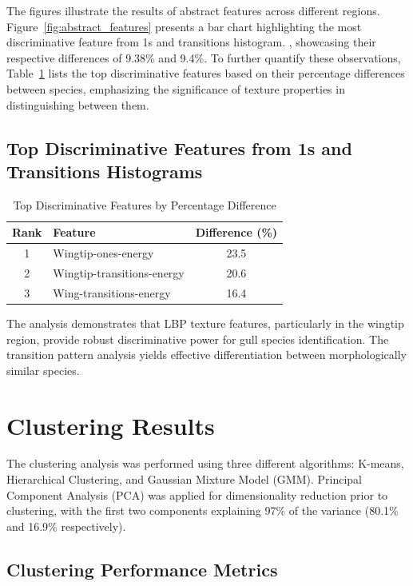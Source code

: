 \documentclass[a4paper,12pt]{report}
\begin{document}
The figures illustrate the results of abstract features across different regions. Figure~\ref{fig:abstract_features} presents a bar chart highlighting the most discriminative feature from 1s and transitions histogram. , showcasing their respective differences of 9.38\% and 9.4\%. To further quantify these observations, Table~\ref{tab:top_discriminative_features} lists the top discriminative features based on their percentage differences between species, emphasizing the significance of texture properties in distinguishing between them.

\subsection{Top Discriminative Features from 1s and Transitions Histograms}
\begin{table}[H]
    \centering
    \caption{Top Discriminative Features by Percentage Difference}
    \begin{tabular}{clc}
        \hline
        Rank & Feature & Difference (\%) \\
        \hline
        1 & Wingtip-ones-energy & 23.5 \\
        2 & Wingtip-transitions-energy & 20.6 \\
        3 & Wing-transitions-energy & 16.4 \\
        \hline
    \end{tabular}
    \label{tab:top_discriminative_features}
\end{table}

The analysis demonstrates that LBP texture features, particularly in the wingtip region, provide robust discriminative power for gull species identification. The transition pattern analysis yields effective differentiation between morphologically similar species.

\section{Clustering Results}

The clustering analysis was performed using three different algorithms: K-means, Hierarchical Clustering, and Gaussian Mixture Model (GMM). Principal Component Analysis (PCA) was applied for dimensionality reduction prior to clustering, with the first two components explaining 97\% of the variance (80.1\% and 16.9\% respectively).

\subsection{Clustering Performance Metrics}
\end{document}
